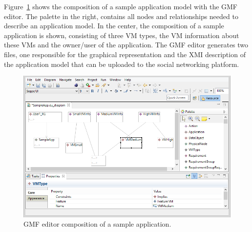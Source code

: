Figure~\ref{fig:sensapp_as_gmf} shows the composition of a sample application model with the GMF editor. The palette in the right, contains all nodes and relationships needed to describe an application model. In the center, the composition of a sample application is shown, consisting of three VM types, the VM information about these VMs and the owner/user of the application. The GMF editor generates two files, one responsible for the graphical representation and the XMI description of the application model that can be uploaded to the social networking platform.

\begin{figure}
  \centering
  \includegraphics[scale=0.6]{./fig/gmf_editor.png}
  \caption{GMF editor composition of a sample application.}
  \label{fig:sensapp_as_gmf}
\end{figure}
